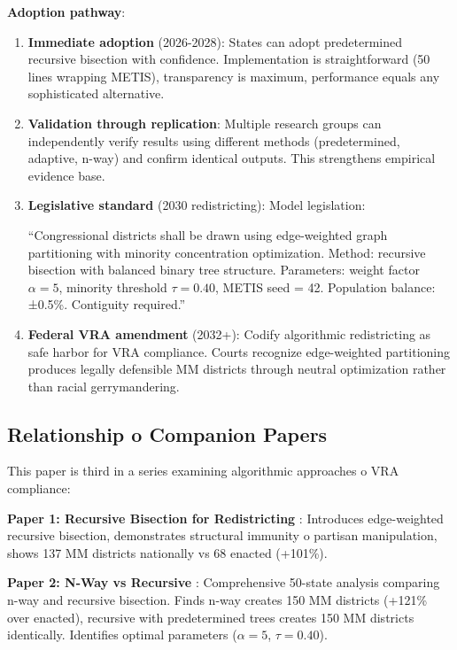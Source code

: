 \textbf{Adoption pathway}:
\begin{enumerate}
\item \textbf{Immediate adoption} (2026-2028): States can adopt predetermined recursive bisection with confidence. Implementation is straightforward (50 lines wrapping METIS), transparency is maximum, performance equals any sophisticated alternative.

\item \textbf{Validation through replication}: Multiple research groups can independently verify results using different methods (predetermined, adaptive, n-way) and confirm identical outputs. This strengthens empirical evidence base.

\item \textbf{Legislative standard} (2030 redistricting): Model legislation:

``Congressional districts shall be drawn using edge-weighted graph partitioning with minority concentration optimization. Method: recursive bisection with balanced binary tree structure. Parameters: weight factor $\alpha = 5$, minority threshold $\tau = 0.40$, METIS seed = 42. Population balance: ±0.5\%. Contiguity required.''

\item \textbf{Federal VRA amendment} (2032+): Codify algorithmic redistricting as safe harbor for VRA compliance. Courts recognize edge-weighted partitioning produces legally defensible MM districts through neutral optimization rather than racial gerrymandering.
\end{enumerate}

\subsection{Relationship 	o Companion Papers}

This paper is third in a series examining algorithmic approaches 	o VRA compliance:

\textbf{Paper 1: Recursive Bisection for Redistricting} \citep{dellaLibera2026recursive}: Introduces edge-weighted recursive bisection, demonstrates structural immunity 	o partisan manipulation, shows 137 MM districts nationally vs 68 enacted (+101\%).

\textbf{Paper 2: N-Way vs Recursive} \citep{dellaLibera2026nwayRecursive}: Comprehensive 50-state analysis comparing n-way and recursive bisection. Finds n-way creates 150 MM districts (+121\% over enacted), recursive with predetermined trees creates 150 MM districts identically. Identifies optimal parameters ($\alpha=5$, $\tau=0.40$).


